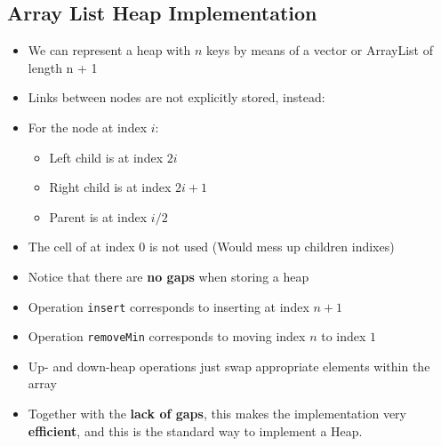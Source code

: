 \documentclass{article}
\begin{document}
\subsection{Array List Heap Implementation}
\begin{itemize}
	\item We can represent a heap with $n$ keys by means of a vector or ArrayList of length n + 1
	\item Links between nodes are not explicitly stored, instead:
	\item For the node at index $i$: 
	\begin{itemize}
		\item Left child is at index $2i$
		\item Right child is at index $2i + 1$
		\item Parent is at index $i/2$ 
	\end{itemize}
	\item The cell of at index $0$ is not used (Would mess up children indixes)
	\item Notice that there are \textbf{no gaps} when storing a heap
\end{itemize}
\begin{itemize}
	\item Operation \texttt{insert} corresponds to inserting at index $n + 1$
	\item Operation \texttt{removeMin} corresponds to moving index $n$ to index $1$
	\item Up- and down-heap operations just swap appropriate elements within the array
	\item Together with the \textbf{lack of gaps}, this makes the implementation very \textbf{efficient}, and this is the standard way to implement a Heap.
\end{itemize}
\end{document}
